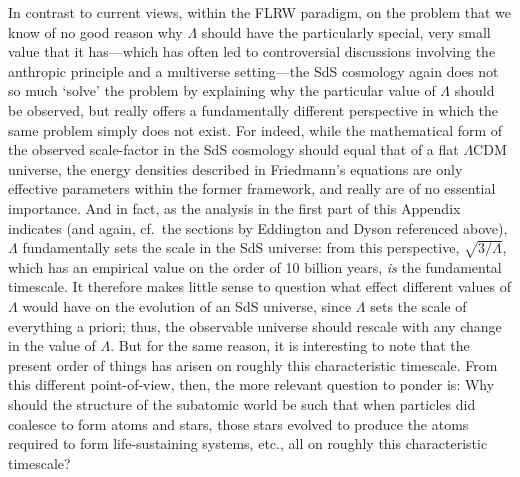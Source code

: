 \documentclass[11pt]{article}
\begin{document}
\begin{appendix}
In contrast to current views, within the FLRW paradigm, on the problem that we know of no good reason why $\Lambda$ should have the particularly special, very small value that it has---which has often led to controversial discussions involving the anthropic principle and a multiverse setting---the SdS cosmology again does not so much `solve' the problem by explaining why the particular value of $\Lambda$ should be observed, but really offers a fundamentally different perspective in which the same problem simply does not exist. For indeed, while the mathematical form of the observed scale-factor in the SdS cosmology should equal that of a flat $\Lambda$CDM universe, the energy densities described in Friedmann's equations are only effective parameters within the former framework, and really are of no essential importance. And in fact, as the analysis in the first part of this Appendix indicates (and again, cf.\ the sections by Eddington \cite{Eddington1923} and Dyson \cite{Dyson1972} referenced above), $\Lambda$ fundamentally sets the scale in the SdS universe: from this perspective, $\sqrt{3/\Lambda}$, which has an empirical value on the order of 10 billion years, \textit{is} the fundamental timescale. It therefore makes little sense to question what effect different values of $\Lambda$ would have on the evolution of an SdS universe, since $\Lambda$ sets the scale of everything a priori; thus, the observable universe should rescale with any change in the value of $\Lambda$. But for the same reason, it is interesting to note that the present order of things has arisen on roughly this characteristic timescale. From this different point-of-view, then, the more relevant question to ponder is: Why should the structure of the subatomic world be such that when particles did coalesce to form atoms and stars, those stars evolved to produce the atoms required to form life-sustaining systems, etc., all on roughly this characteristic timescale?


\end{appendix}
\end{document}
